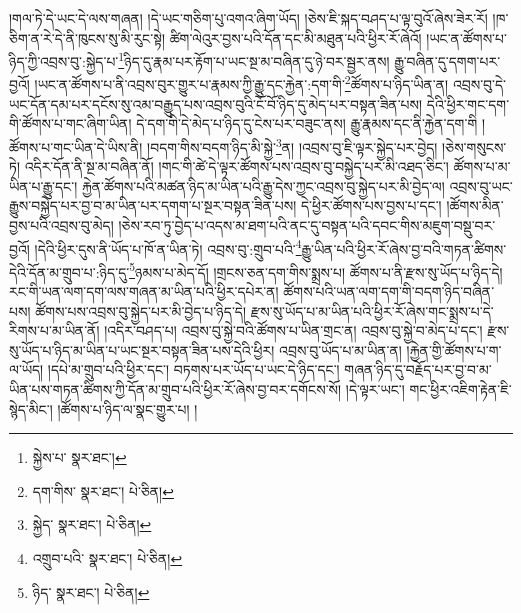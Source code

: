 །གལ་ཏེ་དེ་ཡང་དེ་ལས་གཞན། །དེ་ཡང་གཅིག་པུ་འགའ་ཞིག་ཡོད། །ཅེས་ཇི་སྐད་བཤད་པ་ལྟ་བུའོ་ཞེས་ཟེར་རོ། །ཁ་ཅིག་ན་རེ་དེ་ནི་ཁུངས་སུ་མི་རུང་སྟེ། ཚིག་ལེའུར་བྱས་པའི་དོན་དང་མི་མཐུན་པའི་ཕྱིར་རོ་ཞེའོ། །ཡང་ན་ཚོགས་པ་ཉིད་ཀྱི་འབྲས་བུ་:སྐྱེད་པ་\footnote{སྐྱེས་པ་  སྣར་ཐང་། }ཉིད་དུ་རྣམ་པར་རྟོག་པ་ཡང་སྔ་མ་བཞིན་དུ་ཉེ་བར་སྦྱར་ནས། རྒྱུ་བཞིན་དུ་དགག་པར་བྱའོ། །ཡང་ན་ཚོགས་པ་ནི་འབྲས་བུར་གྱུར་པ་རྣམས་ཀྱི་རྒྱུ་དང་རྐྱེན་:དག་གི་\footnote{དག་གིས་  སྣར་ཐང་།  པེ་ཅིན། }ཚོགས་པ་ཉིད་ཡིན་ན། འབྲས་བུ་དེ་ཡང་དོན་དམ་པར་དངོས་སུ་འམ་བརྒྱུད་པས་འབྲས་བུའི་ངོ་བོ་ཉིད་དུ་མེད་པར་བསྟན་ཟིན་པས། དེའི་ཕྱིར་གང་དག་གི་ཚོགས་པ་གང་ཞིག་ཡིན། དེ་དག་གི་དེ་མེད་པ་ཉིད་དུ་ངེས་པར་བཟུང་ནས། རྒྱུ་རྣམས་དང་ནི་རྐྱེན་དག་གི །ཚོགས་པ་གང་ཡིན་དེ་ཡིས་ནི། །བདག་གིས་བདག་ཉིད་མི་སྐྱེ་\footnote{སྐྱེད་  སྣར་ཐང་།  པེ་ཅིན། }ན། །འབྲས་བུ་ཇི་ལྟར་སྐྱེད་པར་བྱེད། །ཅེས་གསུངས་ཏེ། འདིར་དོན་ནི་སྔ་མ་བཞིན་ནོ། །གང་གི་ཚེ་དེ་ལྟར་ཚོགས་པས་འབྲས་བུ་བསྐྱེད་པར་མི་འཐད་ཅིང་། ཚོགས་པ་མ་ཡིན་པ་རྒྱུ་དང་། རྐྱེན་ཚོགས་པའི་མཚན་ཉིད་མ་ཡིན་པའི་རྒྱུ་དེས་ཀྱང་འབྲས་བུ་སྐྱེད་པར་མི་བྱེད་ལ། འབྲས་བུ་ཡང་རྒྱུས་བསྐྱེད་པར་བྱ་བ་མ་ཡིན་པར་དགག་པ་སྔར་བསྟན་ཟིན་པས། དེ་ཕྱིར་ཚོགས་པས་བྱས་པ་དང་། །ཚོགས་མིན་བྱས་པའི་འབྲས་བུ་མེད། །ཅེས་རབ་ཏུ་བྱེད་པ་འདས་མ་ཐག་པའི་ནང་དུ་བསྟན་པའི་དབང་གིས་མཇུག་བསྡུ་བར་བྱའོ། །དེའི་ཕྱིར་དུས་ནི་ཡོད་པ་ཁོ་ན་ཡིན་ཏེ། འབྲས་བུ་:གྲུབ་པའི་\footnote{འགྲུབ་པའི་  སྣར་ཐང་།  པེ་ཅིན། }རྒྱུ་ཡིན་པའི་ཕྱིར་རོ་ཞེས་བྱ་བའི་གཏན་ཚིགས་དེའི་དོན་མ་གྲུབ་པ་:ཉིད་དུ་\footnote{ཉིད་  སྣར་ཐང་།  པེ་ཅིན། }ཉམས་པ་མེད་དོ། །གྲངས་ཅན་དག་གིས་སྨྲས་པ། ཚོགས་པ་ནི་རྫས་སུ་ཡོད་པ་ཉིད་དེ། རང་གི་ཡན་ལག་དག་ལས་གཞན་མ་ཡིན་པའི་ཕྱིར་དཔེར་ན། ཚོགས་པའི་ཡན་ལག་དག་གི་བདག་ཉིད་བཞིན་པས། ཚོགས་པས་འབྲས་བུ་སྐྱེད་པར་མི་བྱེད་པ་ཉིད་དེ། རྫས་སུ་ཡོད་པ་མ་ཡིན་པའི་ཕྱིར་རོ་ཞེས་གང་སྨྲས་པ་དེ་རིགས་པ་མ་ཡིན་ནོ། །འདིར་བཤད་པ། འབྲས་བུ་སྐྱེ་བའི་ཚོགས་པ་ཡིན་གྲང་ན། འབྲས་བུ་སྐྱེ་བ་མེད་པ་དང་། རྫས་སུ་ཡོད་པ་ཉིད་མ་ཡིན་པ་ཡང་སྔར་བསྟན་ཟིན་པས་དེའི་ཕྱིར། འབྲས་བུ་ཡོད་པ་མ་ཡིན་ན། །རྐྱེན་གྱི་ཚོགས་པ་ག་ལ་ཡོད། །དཔེ་མ་གྲུབ་པའི་ཕྱིར་དང་། བཏགས་པར་ཡོད་པ་ཡང་དེ་ཉིད་དང་། གཞན་ཉིད་དུ་བརྗོད་པར་བྱ་བ་མ་ཡིན་པས་གཏན་ཚིགས་ཀྱི་དོན་མ་གྲུབ་པའི་ཕྱིར་རོ་ཞེས་བྱ་བར་དགོངས་སོ། །དེ་ལྟར་ཡང་། གང་ཕྱིར་འཇིག་རྟེན་ཇི་སྙེད་མིང་། །ཚོགས་པ་ཉིད་ལ་སྣང་གྱུར་པ། །
